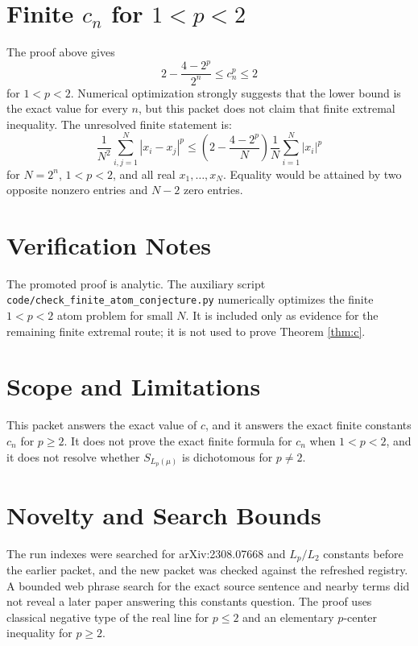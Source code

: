 \documentclass[11pt]{article}
\begin{document}
\section*{Finite \(c_n\) for \(1<p<2\)}

The proof above gives
\[
 2-\frac{4-2^p}{2^n}\leq c_n^p\leq2
\]
for \(1<p<2\).  Numerical optimization strongly suggests that the lower bound is the exact value for every \(n\), but this packet does not claim that finite extremal inequality.  The unresolved finite statement is:
\[
 \frac{1}{N^2}\sum_{i,j=1}^N |x_i-x_j|^p
 \leq
 \left(2-\frac{4-2^p}{N}\right)\frac{1}{N}\sum_{i=1}^N |x_i|^p
\]
for \(N=2^n\), \(1<p<2\), and all real \(x_1,\ldots,x_N\).  Equality would be attained by two opposite nonzero entries and \(N-2\) zero entries.

\section*{Verification Notes}

The promoted proof is analytic.  The auxiliary script \texttt{code/check\_finite\_atom\_conjecture.py} numerically optimizes the finite \(1<p<2\) atom problem for small \(N\).  It is included only as evidence for the remaining finite extremal route; it is not used to prove Theorem \ref{thm:c}.

\section*{Scope and Limitations}

This packet answers the exact value of \(c\), and it answers the exact finite constants \(c_n\) for \(p\geq2\).  It does not prove the exact finite formula for \(c_n\) when \(1<p<2\), and it does not resolve whether \(S_{L_p(\mu)}\) is dichotomous for \(p\neq2\).

\section*{Novelty and Search Bounds}

The run indexes were searched for arXiv:2308.07668 and \(L_p/L_2\) constants before the earlier packet, and the new packet was checked against the refreshed registry.  A bounded web phrase search for the exact source sentence and nearby terms did not reveal a later paper answering this constants question.  The proof uses classical negative type of the real line for \(p\leq2\) and an elementary \(p\)-center inequality for \(p\geq2\).
\end{document}
